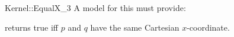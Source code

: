 \begin{ccRefFunctionObjectConcept}{Kernel::EqualX_3}
A model for this must provide:


{returns true iff $p$ and $q$ have the same Cartesian $x$-coordinate.}

\ccSeeAlso
{}\\

\end{ccRefFunctionObjectConcept}
